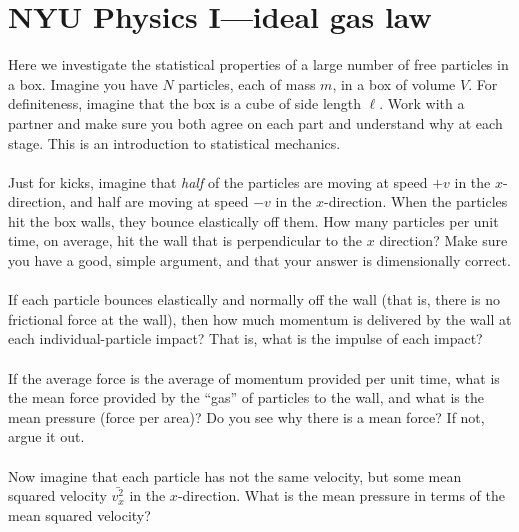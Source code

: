 \documentclass[12pt]{article}
\begin{document}
\section*{NYU Physics I---ideal gas law}

Here we investigate the statistical properties of a large number of
free particles in a box.
Imagine you have $N$ particles, each of mass $m$, in a box of volume $V$.
For definiteness, imagine that the box is a cube of side length $\ell$.
Work with a partner and make sure you both agree on each part and understand
why at each stage. This is an introduction to statistical mechanics.

\paragraph{\theproblem}%
Just for kicks, imagine that \emph{half} of the particles are moving
at speed $+v$ in the $x$-direction, and half are moving at speed $-v$
in the $x$-direction. When the particles hit the box walls, they
bounce elastically off them. How many particles per unit time, on
average, hit the wall that is perpendicular to the $x$ direction?
Make sure you have a good, simple argument, and that your answer is
dimensionally correct.

\paragraph{\theproblem}%
If each particle bounces elastically and normally off the wall (that
is, there is no frictional force at the wall), then how much momentum
is delivered by the wall at each individual-particle impact? That is,
what is the impulse of each impact?

\paragraph{\theproblem}%
If the average force is the average of momentum provided per unit
time, what is the mean force provided by the ``gas'' of particles to
the wall, and what is the mean pressure (force per area)? Do you see
why there is a mean force? If not, argue it out.

\paragraph{\theproblem}%
Now imagine that each particle has not the same velocity, but some
mean squared velocity $\bar{v_x^2}$ in the $x$-direction. What is the
mean pressure in terms of the mean squared velocity?
\end{document}
